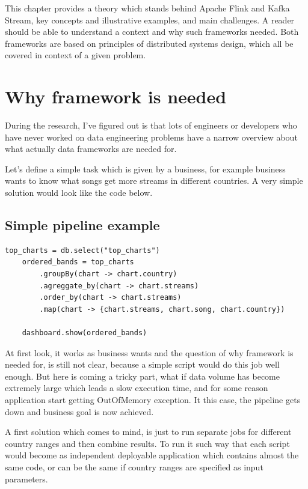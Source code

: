 This chapter provides a theory which stands behind Apache Flink and Kafka Stream,
key concepts and illustrative examples, and main challenges.
A reader should be able to understand a context and why such frameworks needed.
Both frameworks are based on principles of distributed systems design, which
all be covered in context of a given problem.

\section{Why framework is needed}\label{subsec:why-framework-is-needed}
During the research, I've figured out is that lots of engineers or developers who
have never worked on data engineering problems have a narrow overview about
what actually data frameworks are needed for.

Let's define a simple task which is given by a business, for example business wants to know
what songs get more streams in different countries.
A very simple solution would look like the code below.

\subsection{Simple pipeline example}\label{subsec:simple-pip}
\begin{lstlisting}[label={lst:chart_list}]
    top_charts = db.select("top_charts")
    ordered_bands = top_charts
        .groupBy(chart -> chart.country)
        .agreggate_by(chart -> chart.streams)
        .order_by(chart -> chart.streams)
        .map(chart -> {chart.streams, chart.song, chart.country})

    dashboard.show(ordered_bands)
\end{lstlisting}

At first look, it works as business wants and the question of why framework is needed for,
is still not clear, because a simple script would do this job well enough.
But here is coming a tricky part, what if data volume has become extremely large
which leads a slow execution time, and for some reason application start getting OutOfMemory exception.
It this case, the pipeline gets down and business goal is now achieved.

A first solution which comes to mind, is just to run separate jobs for different country ranges and
then combine results.
To run it such way that each script would become as independent deployable application
which contains almost the same code, or can be the same if country ranges are specified as
input parameters.

